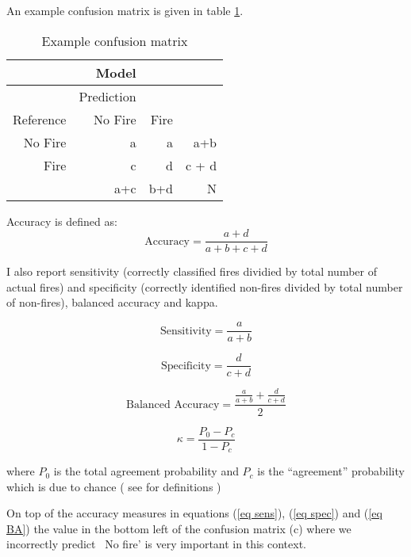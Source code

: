 \documentclass[11pt,a4paper]{article}
\begin{document}
An example confusion matrix is given in table \ref{table:ex}. 
\begin{table}[ht]
	\centering
	\begin{tabular}{r|rr|r}
		& Model & & \\ 
		\hline
		& Prediction   & &  \\ 
		Reference & No Fire & Fire & \\ 
		\hline
		No Fire & a & a & a+b \\ 
		Fire & c & d  & c + d \\ 
		\hline
		 & a+c & b+d & N \\
	\end{tabular}
	\caption{Example confusion matrix}
	\label{table:ex}
\end{table}

Accuracy is defined as:
\begin{equation}
\label{eq acc}
\mbox{Accuracy} = \frac{a + d}{a+b+c+d}
\end{equation}

I also report sensitivity (correctly classified fires dividied by total number of actual fires) and specificity (correctly identified non-fires divided by total number of non-fires), balanced accuracy and kappa. 

\begin{equation}
\label{eq sens}
\mbox{Sensitivity} = \frac{a }{a+b}
\end{equation}

\begin{equation}
\label{eq spec}
\mbox{Specificity} = \frac{d}{c+d}
\end{equation}


\begin{equation}
\label{eq BA}
\mbox{Balanced Accuracy} = \frac{\frac{a }{a+b} + \frac{d}{c+d} }{2}
\end{equation}


\begin{equation}
\label{eq:K}
\kappa = \frac{P_0 - P_c}{1-P_c}
\end{equation}

where $P_0$ is the total agreement probability and $P_c$ is the “agreement” probability which is due to chance ( see \cite{kappa} for definitions )

On top of the accuracy measures in equations (\ref{eq sens}), (\ref{eq spec}) and (\ref{eq BA}) the value in the bottom left of the confusion matrix (c) where we incorrectly predict ~No fire' is very important in this context. 
\end{document}
